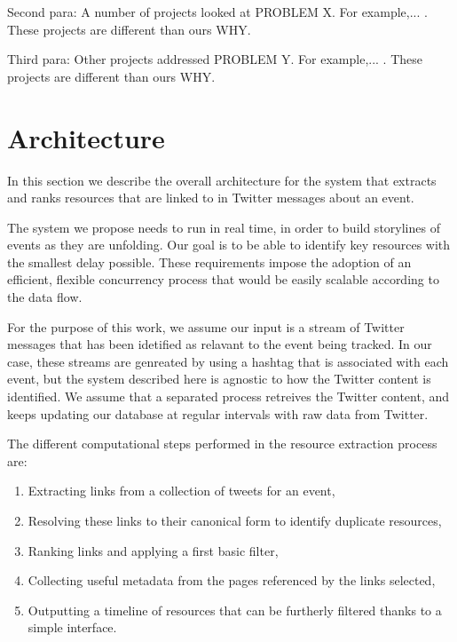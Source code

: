 \documentclass{sig-alternate}
\begin{document}
Second para: A number of projects looked at PROBLEM X. For example,... . These projects are different than ours WHY.

Third para: Other projects addressed PROBLEM Y. For example,... . These projects are different than ours WHY.



\section{Architecture}
\label{sec:architecture}
In this section we describe the overall architecture for the system that extracts and ranks resources that are linked to in Twitter messages about an event.

The system we propose needs to run in real time, in order to build storylines of events as they are unfolding. Our goal is to be able to identify key resources with the smallest delay possible. These requirements impose the adoption of an efficient, flexible concurrency process that would be easily scalable according to the data flow.

For the purpose of this work, we assume our input is a stream of Twitter messages that has been idetified as relavant to the event being tracked. In our case, these streams are genreated by using a hashtag that is associated with each event, but the system described here is agnostic to how the Twitter content is identified. We assume that a separated process retreives the Twitter content, and keeps updating our database at regular intervals with raw data from Twitter.


The different computational steps performed in the resource extraction process are:
\begin{enumerate}
 \item Extracting links from a collection of tweets for an event,
 \item Resolving these links to their canonical form to identify duplicate resources,
 \item Ranking links and applying a first basic filter,
 \item Collecting useful metadata from the pages referenced by the links selected,
 \item Outputting a timeline of resources that can be furtherly filtered thanks to a simple interface.
\end{enumerate}
\end{document}
